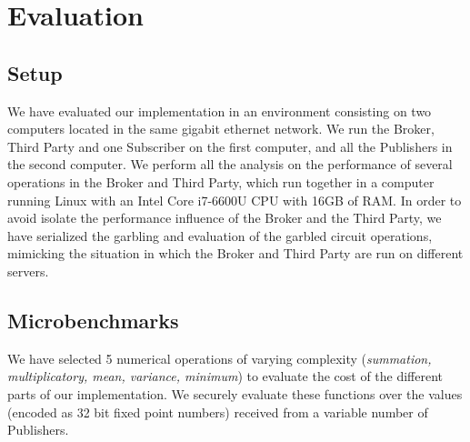 \section{Evaluation}
\label{sec:evaluation}


\subsection{Setup}

We have evaluated our implementation in an environment consisting on two
computers located in the same gigabit ethernet network.  We run the Broker,
Third Party and one Subscriber on the first computer, and all the Publishers in
the second computer.  We perform all the analysis on the performance of several
operations in the Broker and Third Party, which run together in a computer
running Linux with an Intel Core i7-6600U CPU with 16GB of RAM.  In order to
avoid isolate the performance influence of the Broker and the Third Party, we
have serialized the garbling and evaluation of the garbled circuit operations,
mimicking the situation in which the Broker and Third Party are run on
different servers.

\subsection{Microbenchmarks}

We have selected 5 numerical operations of varying complexity (\emph{summation,
multiplicatory, mean, variance, minimum}) to evaluate the cost of the different
parts of our implementation.  We securely evaluate these functions over the
values (encoded as 32 bit fixed point numbers) received from a variable number
of Publishers.


